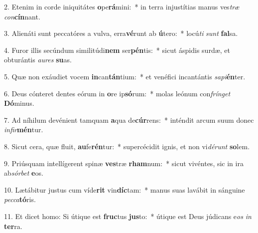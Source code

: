 2. Etenim in corde iniquitátes \textbf{o}pe\textbf{rá}mini:~*  in terra injustítias manus ves\textit{træ} \textit{con}\textbf{cín}nant.\

3. Alienáti sunt peccatóres a vulva, erra\textbf{vé}runt ab \textbf{ú}tero:~*  locú\textit{ti} \textit{sunt} \textbf{fal}sa.\

4. Furor illis secúndum similitúdi\textbf{nem} ser\textbf{pén}tis:~*  sicut áspidis surdæ, et obturántis \textit{au}\textit{res} \textbf{su}as.\

5. Quæ non exáudiet vocem \textbf{in}can\textbf{tán}tium:~*  et venéfici incantántis \textit{sa}\textit{pi}\textbf{én}ter.\

6. Deus cónteret dentes eórum in \textbf{o}re ip\textbf{só}rum:~*  molas leónum con\textit{frín}\textit{get} \textbf{Dó}minus.\

7. Ad níhilum devénient tamquam \textbf{a}qua de\textbf{cúr}rens:~*  inténdit arcum suum donec \textit{in}\textit{fir}\textbf{mén}tur.\

8. Sicut cera, quæ fluit, \textbf{au}fe\textbf{rén}tur:~*  supercécidit ignis, et non vi\textit{dé}\textit{runt} \textbf{so}lem.\

9. Priúsquam intellígerent spinæ \textbf{ves}træ \textbf{rham}num:~*  sicut vivéntes, sic in ira ab\textit{sór}\textit{bet} \textbf{e}os.\

10. Lætábitur justus cum víde\textbf{rit} vin\textbf{díc}tam:~*  manus suas lavábit in sánguine \textit{pec}\textit{ca}\textbf{tó}ris.\

11. Et dicet homo: Si útique est \textbf{fruc}tus \textbf{jus}to:~*  útique est Deus júdicans e\textit{os} \textit{in} \textbf{ter}ra.\

